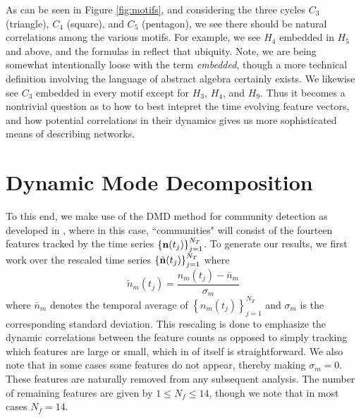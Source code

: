 \documentclass[a4paper,11pt]{article}
\begin{document}
As can be seen in Figure \ref{fig:motifs}, and considering the three cycles $C_{3}$ (triangle), $C_{4}$ (square), and $C_{5}$ (pentagon), we see there should be natural correlations among the various motifs.  For example, we see $H_4$ embedded in $H_{5}$ and above, and the formulas in \cite{alon} reflect that ubiquity.  Note, we are being somewhat intentionally loose with the term {\it embedded}, though a more technical definition involving the language of abstract algebra certainly exists.  We likewise see $C_{3}$ embedded in every motif except for $H_{3}$, $H_{4}$, and $H_{9}$.  Thus it becomes a nontrivial question as to how to best intepret the time evolving feature vectors, and how potential correlations in their dynamics gives us more sophisticated means of describing networks.  
\section{Dynamic Mode Decomposition}
To this end, we make use of the DMD method for community detection as developed in \cite{curtis2021detection}, where in this case, ``communities" will consist of the fourteen features tracked by the time series $\left\{{\bf n}(t_{j})\right\}_{j=1}^{N_{T}}$.   To generate our results, we first work over the rescaled time series $\left\{\tilde{{\bf n}}(t_{j})\right\}_{j=1}^{N_{T}}$ where
\[
\tilde{n}_{m}(t_{j}) = \frac{n_{m}(t_{j}) - \bar{n}_{m}}{\sigma_{m}}
\]
where $\bar{n}_{m}$ denotes the temporal average of $\left\{n_{m}(t_{j})\right\}_{j=1}^{N_{T}}$ and $\sigma_{m}$ is the corresponding standard deviation.  This rescaling is done to emphasize the dynamic correlations between the feature counts as opposed to simply tracking which features are large or small, which in of itself is straightforward.  We also note that in some cases some features do not appear, thereby making $\sigma_{m}=0$.  These features are naturally removed from any subsequent analysis.  The number of remaining features are given by $1\leq N_{f}\leq 14$, though we note that in most cases $N_{f}=14$.  %
\end{document}
